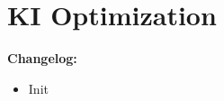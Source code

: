\chapter{KI Optimization}
\setcounter{section}{0}

\textbf{Changelog:}\\
\begin{itemize}
	\item 	{} Init
\end{itemize}

\pagebreak
